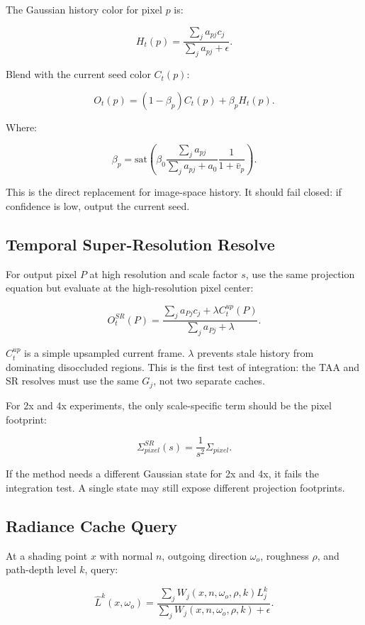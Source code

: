 \documentclass[11pt]{article}
\begin{document}
The Gaussian history color for pixel $p$ is:

\[
  H_t(p) =
  \frac{\sum_j a_{pj}c_j}{\sum_j a_{pj}+\epsilon}.
\]

Blend with the current seed color $C_t(p)$:

\[
  O_t(p) =
  (1-\beta_p)C_t(p) + \beta_p H_t(p).
\]

Where:

\[
  \beta_p =
  \mathrm{sat}\left(
  \beta_0
  \frac{\sum_j a_{pj}}{\sum_j a_{pj}+a_0}
  \frac{1}{1+\bar{v}_p}
  \right).
\]

This is the direct replacement for image-space history. It should fail closed:
if confidence is low, output the current seed.

\subsection{Temporal Super-Resolution Resolve}

For output pixel $P$ at high resolution and scale factor $s$, use the same
projection equation but evaluate at the high-resolution pixel center:

\[
  O^{SR}_t(P) =
  \frac{\sum_j a_{Pj}c_j + \lambda C^{up}_t(P)}
       {\sum_j a_{Pj}+\lambda}.
\]

$C^{up}_t$ is a simple upsampled current frame. $\lambda$ prevents stale
history from dominating disoccluded regions. This is the first test of
integration: the TAA and SR resolves must use the same $G_j$, not two separate
caches.

For 2x and 4x experiments, the only scale-specific term should be the pixel
footprint:

\[
  \Sigma_{pixel}^{SR}(s) =
  \frac{1}{s^2}\Sigma_{pixel}.
\]

If the method needs a different Gaussian state for 2x and 4x, it fails the
integration test. A single state may still expose different projection
footprints.

\subsection{Radiance Cache Query}

At a shading point $x$ with normal $n$, outgoing direction $\omega_o$, roughness
$\rho$, and path-depth level $k$, query:

\[
  \hat{L}^k(x,\omega_o) =
  \frac{\sum_j W_j(x,n,\omega_o,\rho,k)L_j^k}
       {\sum_j W_j(x,n,\omega_o,\rho,k)+\epsilon}.
\]
\end{document}
